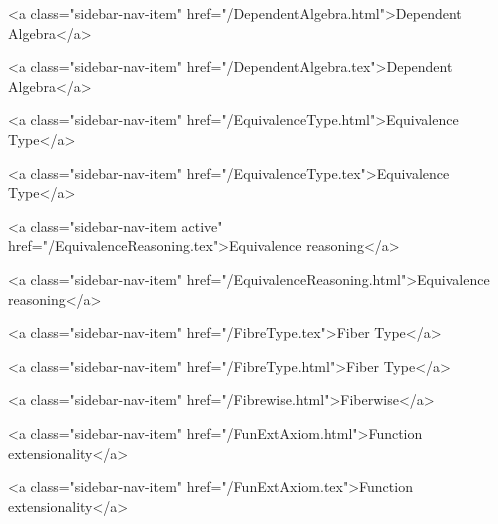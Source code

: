       
    
      
        
          <a class="sidebar-nav-item" href="/DependentAlgebra.html">Dependent Algebra</a>
        
      
    
      
        
          <a class="sidebar-nav-item" href="/DependentAlgebra.tex">Dependent Algebra</a>
        
      
    
      
        
          <a class="sidebar-nav-item" href="/EquivalenceType.html">Equivalence Type</a>
        
      
    
      
        
          <a class="sidebar-nav-item" href="/EquivalenceType.tex">Equivalence Type</a>
        
      
    
      
        
          <a class="sidebar-nav-item active" href="/EquivalenceReasoning.tex">Equivalence reasoning</a>
        
      
    
      
        
          <a class="sidebar-nav-item" href="/EquivalenceReasoning.html">Equivalence reasoning</a>
        
      
    
      
        
          <a class="sidebar-nav-item" href="/FibreType.tex">Fiber Type</a>
        
      
    
      
        
          <a class="sidebar-nav-item" href="/FibreType.html">Fiber Type</a>
        
      
    
      
        
          <a class="sidebar-nav-item" href="/Fibrewise.html">Fiberwise</a>
        
      
    
      
        
          <a class="sidebar-nav-item" href="/FunExtAxiom.html">Function extensionality</a>
        
      
    
      
        
          <a class="sidebar-nav-item" href="/FunExtAxiom.tex">Function extensionality</a>
        
